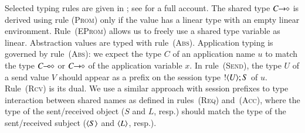 \documentclass[runningheads]{llncs}
\begin{document}
Selected typing rules are given in ; 
see \cite{KouzapasPY15} for a full account.
The shared type $C\!\! \rightarrow\!\! \diamond$ %
is derived using rule \textsc{(Prom)} only  
if the value has a linear type with an empty linear
environment.
Rule~\textsc{(EProm)} allows us to freely use a shared
type variable as linear.
%
Abstraction values are typed with rule~\textsc{(Abs)}.
Application typing
is governed by rule~\textsc{(Abs)}: we expect
the type $C$ of an application name $u$ 
to match the type $C\!\! \multimap\!\! \diamond$ or $C\!\! \rightarrow\!\! \diamond$
of the application variable $x$.
%
In rule~\textsc{(Send)}, 
the type $U$ of a send value $V$ should appear as a prefix
on the session type $! \langle U \rangle ; S$ of $u$.
Rule~\textsc{(Rcv)} is its dual.  
We use a similar approach with session prefixes
to type interaction between shared names as defined 
in rules~\textsc{(Req)} and~\textsc{(Acc)},
where the type of the sent/received object 
($S$ and $L$, resp.) should
match the type of the sent/received subject
($\langle S \rangle$ and $\langle L \rangle$, resp.).
\end{document}
